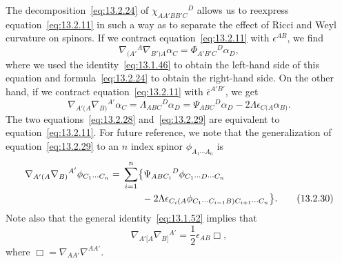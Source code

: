 The decomposition~\eqref{eq:13.2.24} of \(\chi_{AA'BB'C}{}^D\) allows us to
reexpress equation~\eqref{eq:13.2.11} in such a way as to separate the effect of
Ricci and Weyl curvature on spinors. If we contract equation~\eqref{eq:13.2.11}
with \(\epsilon^{AB}\), we find
\begin{equation}
  \nabla_{(A'}{}^A\nabla_{B')A}\alpha_C
  =\Phi_{A'B'C}{}^D\alpha_D,
  \tag{13.2.28}\label{eq:13.2.28}
\end{equation}
where we used the identity~\eqref{eq:13.1.46} to obtain the left-hand side of this
equation and formula~\eqref{eq:13.2.24} to obtain the right-hand side. On the other
hand, if we contract equation~\eqref{eq:13.2.11} with
\(\overline\epsilon^{A'B'}\), we get
\begin{equation}
  \nabla_{A'(A}\nabla_{B)}{}^{A'}\alpha_C
  =\Lambda_{ABC}{}^D\alpha_D
  =\Psi_{ABC}{}^D\alpha_D-2\Lambda\epsilon_{C(A}\alpha_{B)}.
  \tag{13.2.29}\label{eq:13.2.29}
\end{equation}
The two equations~\eqref{eq:13.2.28} and~\eqref{eq:13.2.29} are equivalent to
equation~\eqref{eq:13.2.11}. For future reference, we note that the generalization
of equation~\eqref{eq:13.2.29} to an \(n\) index spinor
\(\phi_{A_1\cdots A_n}\) is
\begin{align}
  \nabla_{A'(A}\nabla_{B)}{}^{A'}\phi_{C_1\cdots C_n}
  ={}&\sum_{i=1}^n\bigl\{
    \Psi_{ABC_i}{}^D\phi_{C_1\cdots D\cdots C_n}\notag\\
   &\qquad{}-2\Lambda\epsilon_{C_i(A}
     \phi_{C_1\cdots C_{i-1}B)C_{i+1}\cdots C_n}
    \bigr\}.
  \tag{13.2.30}\label{eq:13.2.30}
\end{align}
Note also that the general identity~\eqref{eq:13.1.52} implies that
\begin{equation}
  \nabla_{A'[A}\nabla_{B]}{}^{A'}=\frac12\epsilon_{AB}\Box,
  \tag{13.2.31}\label{eq:13.2.31}
\end{equation}
where \(\Box=\nabla_{AA'}\nabla^{AA'}\).

